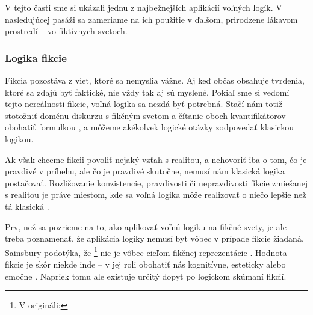 \documentclass[12pt, letterpaper]{article}
\begin{document}

V tejto časti sme si ukázali jednu z najbežnejších aplikácií voľných logík. V nasledujúcej pasáži sa zameriame na ich použitie v ďalšom, prirodzene lákavom prostredí -- vo fiktívnych svetoch.
\subsubsection{Logika fikcie}
Fikcia pozostáva z viet, ktoré sa nemyslia vážne. Aj keď občas obsahuje tvrdenia, ktoré sa zdajú byť faktické, nie vždy tak aj sú myslené. Pokiaľ sme si vedomí tejto nereálnosti fikcie, voľná logika sa nezdá byť potrebná. Stačí nám totiž stotožniť doménu diskurzu s fikčným svetom a čítanie oboch kvantifikátorov obohatiť formulkou , a môžeme akékoľvek logické otázky zodpovedať klasickou logikou.\par

Ak však chceme fikcii povoliť nejaký vzťah s realitou, a nehovoriť iba o tom, čo je pravdivé v príbehu, ale čo je pravdivé skutočne, nemusí nám klasická logika postačovať. Rozlišovanie konzistencie, pravdivosti či nepravdivosti fikcie zmiešanej s realitou je práve miestom, kde sa voľná logika môže realizovať o niečo lepšie než tá klasická \parencites[]{sep-logic-free}.\par

Prv, než sa pozrieme na to, ako aplikovať voľnú logiku na fikčné svety, je ale treba poznamenať, že aplikácia logiky nemusí byť vôbec v prípade fikcie žiadaná. Sainsbury podotýka, že \footnote{V origináli: } nie je vôbec cieľom fikčnej reprezentácie \parencites[2]{Sainsbury2009}. Hodnota fikcie je skôr niekde inde -- v jej roli obohatiť nás kognitívne, esteticky alebo emočne \parencites[150]{Dumitru2015}. Napriek tomu ale existuje určitý dopyt po logickom skúmaní fikcií.\par
\end{document}
